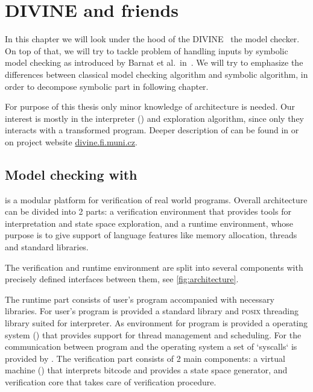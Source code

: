 \chapter{DIVINE and friends}\label{ch:divine}

In this chapter we will look under the hood of the DIVINE~\cite{Divine17} the model checker.
On top of that, we will try to tackle problem of handling inputs by
symbolic model checking as introduced by Barnat et al.~in~\cite{Barnat14}. We will try to emphasize the
differences between classical model checking algorithm and symbolic algorithm,
in order to decompose symbolic part in following chapter.

For purpose of this thesis only minor knowledge of \DIVINE architecture is
needed. Our interest is mostly in the \LLVM interpreter (\DIVM) and exploration algorithm,
since only they interacts with a transformed program. Deeper description of \DIVINE can be found
in \cite{Divine17} or on project website
\href{https://divine.fi.muni.cz/}{divine.fi.muni.cz}.

\section{Model checking with \DIVINE}


\DIVINE is a modular platform for verification of real world programs.
Overall architecture can be divided into 2 parts: a verification environment
that provides tools for \LLVM interpretation and state space exploration, and a
runtime environment, whose purpose is to give support of language features like
memory allocation, threads and standard libraries.

The verification and runtime environment are split into several components with
precisely defined interfaces between them, see \autoref{fig:architecture}.

The runtime part consists of user's program accompanied with necessary
libraries. For user's program is provided a \Cpp{} standard library and \textsc{posix} threading
library suited for \DIVINE interpreter. As environment for program is provided
a \DIVINE operating system (\DIOS) that provides support for thread management
and scheduling. For the communication between program and the operating system a set
of `syscalls` is provided by \DIOS.
The verification part consists of 2 main components: a \DIVINE virtual machine
(\DIVM) that interprets \LLVM bitcode and provides a state space generator, and
verification core that takes care of verification procedure.

